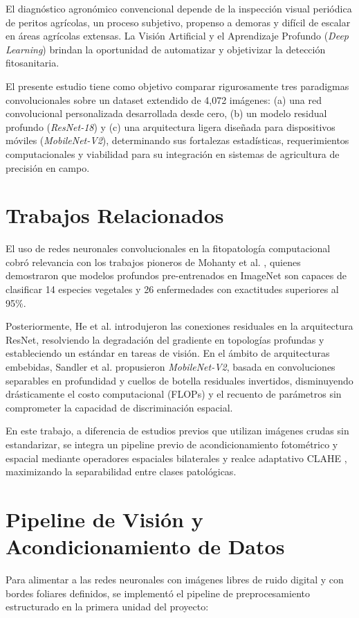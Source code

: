 \documentclass[10pt,a4paper,twoside]{article}
\begin{document}
El diagnóstico agronómico convencional depende de la inspección visual periódica de peritos agrícolas, un proceso subjetivo, propenso a demoras y difícil de escalar en áreas agrícolas extensas. La Visión Artificial y el Aprendizaje Profundo (\textit{Deep Learning}) brindan la oportunidad de automatizar y objetivizar la detección fitosanitaria.

El presente estudio tiene como objetivo comparar rigurosamente tres paradigmas convolucionales sobre un dataset extendido de 4,072 imágenes: (a) una red convolucional personalizada desarrollada desde cero, (b) un modelo residual profundo (\textit{ResNet-18}) y (c) una arquitectura ligera diseñada para dispositivos móviles (\textit{MobileNet-V2}), determinando sus fortalezas estadísticas, requerimientos computacionales y viabilidad para su integración en sistemas de agricultura de precisión en campo.

\section{Trabajos Relacionados}
El uso de redes neuronales convolucionales en la fitopatología computacional cobró relevancia con los trabajos pioneros de Mohanty et al. \cite{mohanty2016using}, quienes demostraron que modelos profundos pre-entrenados en ImageNet \cite{russakovsky2015imagenet} son capaces de clasificar 14 especies vegetales y 26 enfermedades con exactitudes superiores al 95\%.

Posteriormente, He et al. \cite{he2016deep} introdujeron las conexiones residuales en la arquitectura ResNet, resolviendo la degradación del gradiente en topologías profundas y estableciendo un estándar en tareas de visión. En el ámbito de arquitecturas embebidas, Sandler et al. \cite{sandler2018mobilenetv2} propusieron \textit{MobileNet-V2}, basada en convoluciones separables en profundidad y cuellos de botella residuales invertidos, disminuyendo drásticamente el costo computacional (FLOPs) y el recuento de parámetros sin comprometer la capacidad de discriminación espacial.

En este trabajo, a diferencia de estudios previos que utilizan imágenes crudas sin estandarizar, se integra un pipeline previo de acondicionamiento fotométrico y espacial mediante operadores espaciales bilaterales \cite{tomasi1998bilateral} y realce adaptativo CLAHE \cite{pizer1987adaptive}, maximizando la separabilidad entre clases patológicas.

\section{Pipeline de Visión y Acondicionamiento de Datos}
Para alimentar a las redes neuronales con imágenes libres de ruido digital y con bordes foliares definidos, se implementó el pipeline de preprocesamiento estructurado en la primera unidad del proyecto:
\end{document}
